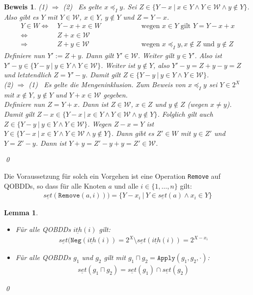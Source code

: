 \documentclass[ngerman]{scrartcl}
\theoremstyle{custom}
\newtheorem{ml}[mdef]{Lemma}
\newtheorem*{bw}{Beweis}
\newcommand{\0}{\mathbf{0}}
\newcommand{\1}{\mathbf{L}}
\newcommand{\set}{\underline{set}}
\newcommand{\W}{\mathcal{W}}
\newcommand{\ith}{\underline{ith}}
\newcommand{\ww}{\preccurlyeq _{I}}
\begin{document}
\begin{bw}
\glqq(1) $\Rightarrow$ (2)\grqq~ Es gelte $x \ww y$. Sei $Z \in \{Y-x ~\vert~ x \in Y \wedge Y \in \W \wedge y \not \in
Y\}$. Also gibt es $Y$ mit $Y \in \W$,
$x \in Y$, $y \not \in Y$ und $Z = Y-x$. 
\begin{align*}
Y \in W \Leftrightarrow &~ Y-x+x \in W \hspace{2cm}&\text{ wegen } x \in
Y \text{ gilt } Y=Y-x+x\\
\Leftrightarrow &~ Z+x \in \W \\
\Rightarrow &~ Z+y \in \W &\text{ wegen } x \ww y, x \not
\in Z \text{ und } y \not \in Z
\end{align*}
Definiere nun $Y' := Z+y$. Dann gilt $Y' \in \W$. Weiter gilt $y \in
Y'$. Also ist $Y'-y \in  \{Y-y ~\vert~ y \in Y \wedge Y \in
\W\}$. Weiter ist $y \not \in Y$, also $Y'-y=Z+y-y=Z$ und letztendlich
$Z = Y'-y$. Damit gilt $Z \in  \{Y-y ~\vert~ y \in Y \wedge Y \in
\W\}$.\\

\glqq(2) $\Rightarrow$ (1)\grqq~ Es gelte die Mengeninklusion. Zum
Beweis von $x \ww y$ sei $Y \in 2^X$ mit $x \not \in Y$, $y \not \in
Y$ und $Y+x \in \W$ gegeben.\\
Definiere nun $Z = Y+x$. Dann ist $Z \in \W$, $x \in Z$ und $y \not
\in Z$ (wegen $x \not = y$). Damit gilt $Z-x \in \{Y-x ~\vert~ x \in Y \wedge Y \in \W \wedge y \not \in
Y\}$. Folglich gilt auch $Z \in \{Y-y ~\vert~ y \in Y \wedge Y \in
\W\}$. Wegen $Z-x=Y$ ist $Y \in  \{Y-x ~\vert~ x \in Y \wedge Y \in \W \wedge y \not \in
Y\}$. Dann gibt es $Z' \in W$ mit $y \in Z'$ und $Y = Z'-y$. Dann ist
$Y+y=Z'-y+y=Z' \in \W$.

\qed
\end{bw}
Die Voraussetzung f\"ur solch ein Vorgehen ist eine Operation
\texttt{Remove} auf QOBDDs, so dass f\"ur alle Knoten $a$ und alle $i
\in \{1,\dots,n\}$ gilt:
\begin{align*}
\set(\texttt{Remove}(a,i))) = \{Y-x_i ~\vert~ Y \in \set(a) \wedge x_i
\in Y\}
\end{align*}

\begin{ml}
\begin{itemize}
\item[(1)] F\"ur alle QOBDDs $\ith(i)$ gilt:
\begin{align*}
\set(\texttt{Neg}(\ith(i)) = 2^X \setminus \set(\ith(i)) = 2^{X-x_i}
\end{align*}
\item[(2)] F\"ur alle QOBDDs $g_1$ und $g_2$ gilt mit $g_1 \sqcap g_2
  = \texttt{Apply}(g_1,g_2,\cdot)$:
\begin{align*}
\set(g_1 \sqcap g_2) = \set(g_1) \cap \set(g_2)
\end{align*}
\end{itemize}
\qed
\end{ml}
\end{document}
